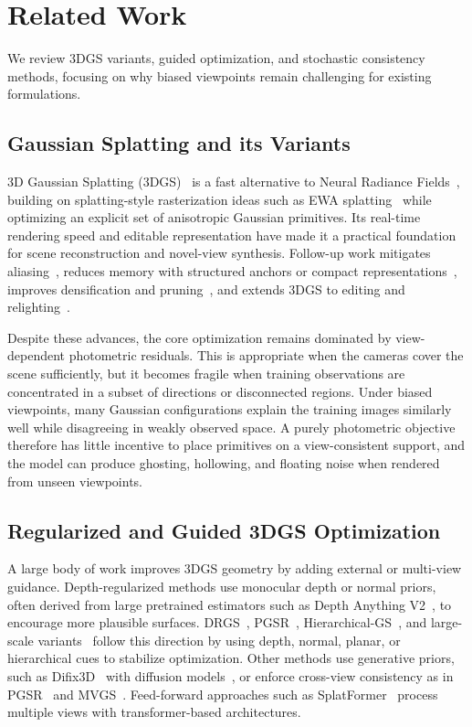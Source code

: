 \documentclass[lettersize,journal]{IEEEtran}
\begin{document}
\section{Related Work}

We review 3DGS variants, guided optimization, and stochastic consistency methods, focusing on why biased viewpoints remain challenging for existing formulations.

\subsection{Gaussian Splatting and its Variants}

3D Gaussian Splatting (3DGS)~\cite{3dgs} is a fast alternative to Neural Radiance Fields~\cite{nerf}, building on splatting-style rasterization ideas such as EWA splatting~\cite{ewa} while optimizing an explicit set of anisotropic Gaussian primitives. Its real-time rendering speed and editable representation have made it a practical foundation for scene reconstruction and novel-view synthesis. Follow-up work mitigates aliasing~\cite{mipsplatting}, reduces memory with structured anchors or compact representations~\cite{scaffold,hi-lsplat}, improves densification and pruning~\cite{ekf-gs,densesplat,steepgs,mcmc}, and extends 3DGS to editing and relighting~\cite{sketchfacegs,ssdgs}.

Despite these advances, the core optimization remains dominated by view-dependent photometric residuals. This is appropriate when the cameras cover the scene sufficiently, but it becomes fragile when training observations are concentrated in a subset of directions or disconnected regions. Under biased viewpoints, many Gaussian configurations explain the training images similarly well while disagreeing in weakly observed space. A purely photometric objective therefore has little incentive to place primitives on a view-consistent support, and the model can produce ghosting, hollowing, and floating noise when rendered from unseen viewpoints.

\subsection{Regularized and Guided 3DGS Optimization}

A large body of work improves 3DGS geometry by adding external or multi-view guidance. Depth-regularized methods use monocular depth or normal priors, often derived from large pretrained estimators such as Depth Anything V2~\cite{dav2}, to encourage more plausible surfaces. DRGS~\cite{drgs}, PGSR~\cite{pgsr}, Hierarchical-GS~\cite{hierarchical}, and large-scale variants~\cite{citygaussian} follow this direction by using depth, normal, planar, or hierarchical cues to stabilize optimization. Other methods use generative priors, such as Difix3D~\cite{difix3d+} with diffusion models~\cite{diffusion}, or enforce cross-view consistency as in PGSR~\cite{pgsr} and MVGS~\cite{mvgs}. Feed-forward approaches such as SplatFormer~\cite{splatformer} process multiple views with transformer-based architectures.
\end{document}
